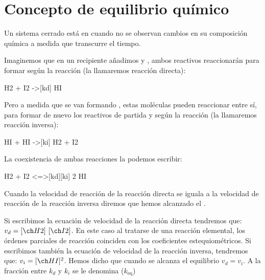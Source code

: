 \vspace*{18pt}

\section{Concepto de equilibrio químico}\label{sec:concepto-de-equilibrio-quimico}

\begin{center}
    \begin{definition}
        Un sistema cerrado está en  cuando no se observan cambios en su composición química a medida que transcurre el tiempo.
    \end{definition}
\end{center}

Imaginemos que en un recipiente añadimos  y , ambos reactivos reaccionarán para formar  según la reacción (la llamaremos reacción directa):

\begin{reaction}[Formación de HI]
    H2\gas{} + I2\gas{} ->[kd] HI\gas{} \label{rxn:formacionHI}
\end{reaction}

Pero a medida que se van formando , estas moléculas pueden reaccionar entre sí, para formar de nuevo los reactivos de partida  y  según la reacción (la llamaremos reacción inversa):
\begin{reaction}[Descomposición de HI]
    HI\gas{} + HI\gas{} ->[ki] H2\gas{} + I2\gas{} \label{rxn:descomposicionHI}
\end{reaction}

La coexistencia de ambas reacciones la podemos escribir:

\begin{reaction}[Equilibrio HI]
    H2\gas{} + I2\gas{} <=>[kd][ki] 2 HI\gas{} \label{rxn:equilibrioHI}
\end{reaction}

Cuando la velocidad de reacción de la reacción directa se iguala a la velocidad de reacción de la reacción inversa diremos que hemos alcanzado el .

Si escribimos la ecuación de velocidad de la reacción directa tendremos que: $v_d = \conc{H2}\ \conc{I2}$.
En este caso al tratarse de una reacción elemental, los órdenes parciales de reacción coinciden con los coeficientes estequiométricos.
Si escribimos también la ecuación de velocidad de la reacción inversa, tendremos que: $v_i = \conc{HI}^2$.
Hemos dicho que cuando se alcanza el equilibrio $v_d = v_i$.
A la fracción entre $k_d$ y $k_i$ se le denomina  ($k_{\text{eq}}$)


